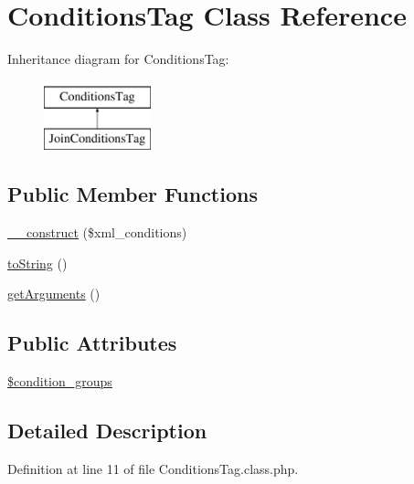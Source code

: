 \hypertarget{classConditionsTag}{\section{Conditions\-Tag Class Reference}
\label{classConditionsTag}
}
Inheritance diagram for Conditions\-Tag\-:\begin{figure}[H]
\begin{center}
\leavevmode
\includegraphics[height=2.000000cm]{classConditionsTag}
\end{center}
\end{figure}
\subsection*{Public Member Functions}
\begin{DoxyCompactItemize}
\item 
\hyperlink{classConditionsTag_a5ea530ab8c6248052b95bd83774da505}{\-\_\-\-\_\-construct} (\$xml\-\_\-conditions)
\item 
\hyperlink{classConditionsTag_af458fe76fa1ffb006306c682e024ee5a}{to\-String} ()
\item 
\hyperlink{classConditionsTag_a8c7e8f873db4fa6e6c35920bed31afae}{get\-Arguments} ()
\end{DoxyCompactItemize}
\subsection*{Public Attributes}
\begin{DoxyCompactItemize}
\item 
\hyperlink{classConditionsTag_a494a016d168c8e44cd05638e6c991805}{\$condition\-\_\-groups}
\end{DoxyCompactItemize}


\subsection{Detailed Description}


Definition at line 11 of file Conditions\-Tag.\-class.\-php.



